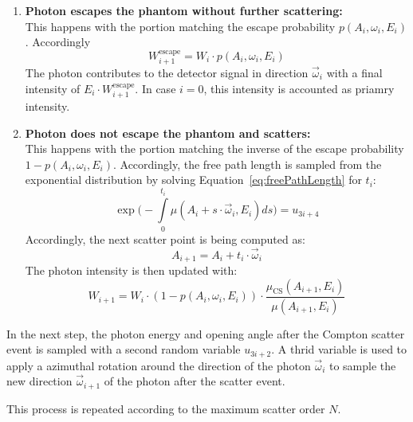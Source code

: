\begin{enumerate}
    \item \textbf{Photon escapes the phantom without further scattering:}\\
        This happens with the portion matching the escape probability $p(A_i,
        \omega_i, E_i)$. Accordingly 
        \begin{equation}
            W^{\text{escape}}_{i+1} = W_i \cdot p(A_i, \omega_i, E_i)
        \end{equation}
        The photon contributes to the detector signal in direction
        $\vec{\omega}_i$ with a final intensity of $E_i \cdot
        W^{\text{escape}}_{i+1}$. In case $i=0$, this intensity is accounted as
        priamry intensity.

    \item \textbf{Photon does not escape the phantom and scatters:}\\
        This happens with the portion matching the inverse of the escape
        probability $1 - p(A_i, \omega_i, E_i)$. Accordingly, the free path
        length is sampled from the exponential distribution by solving
        Equation~\ref{eq:freePathLength} for $t_i$:
        \begin{equation}
            \label{eq:freePathLength}
            \exp\bigg(-\int\limits_0^{t_i} \mu(A_{i} + s \cdot \vec{\omega}_
            {i}, E_{i}) ds\bigg) = u_{3i+4}
        \end{equation}
        Accordingly, the next scatter point is being computed as:
        \begin{equation}
            A_{i+1} = A_i + t_i \cdot \vec{\omega}_i
        \end{equation}
        The photon intensity is then updated with:
        \begin{equation}
            W_{i+1} = W_i \cdot (1 - p(A_i, \omega_i, E_i)) \cdot \frac{\mu_
            {\text{CS}}(A_{i+1}, E_i)}{\mu(A_{i+1}, E_i)}
        \end{equation}
\end{enumerate}


In the next step, the photon energy and opening angle after the Compton scatter
event is sampled with a second random variable $u_{3i+2}$. A thrid variable is
used to apply a azimuthal rotation around the direction of the photon
$\vec{\omega}_i$ to sample the new direction $\vec{\omega}_{i+1}$ of the photon
after the scatter event.

This process is repeated according to the maximum scatter order $N$.

